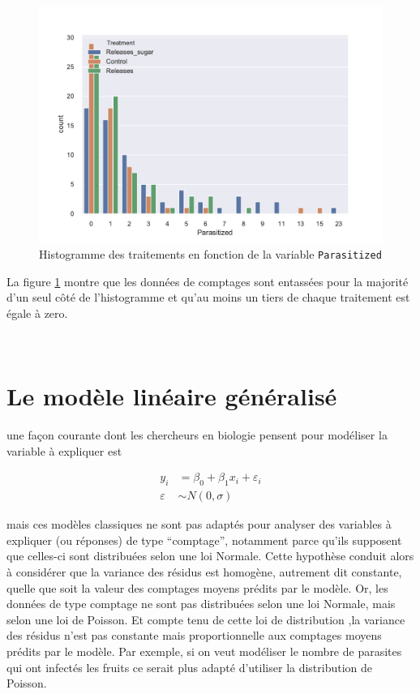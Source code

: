 \documentclass[12pt]{article}
\begin{document}
 \begin{figure}[h]
\centering
 \includegraphics[width=1\textwidth]{Histogram of the count.pdf}
 \caption{Histogramme des traitements en fonction de la variable \texttt{Parasitized} } 
 \label{hist_para}
 \end{figure}
 
 La figure \ref{hist_para} montre que les données de comptages sont entassées pour la majorité d'un seul côté de l'histogramme et qu'au moins un tiers de chaque traitement est égale à zero.


\newpage
~
\newpage
\section{Le modèle linéaire généralisé}
une façon courante dont les chercheurs en biologie pensent pour modéliser la variable à expliquer est

\begin{align*}
y_i &= \beta_0 + \beta_1 x_i + \varepsilon_i \\
\varepsilon &\sim N(0, \sigma)
\tag{1}
\end{align*}

mais ces modèles classiques ne sont pas adaptés pour analyser des variables à expliquer (ou réponses) de type “comptage”, notamment parce qu’ils supposent que celles-ci sont distribuées selon une loi Normale. Cette hypothèse conduit alors à considérer que la variance des résidus est homogène, autrement dit constante, quelle que soit la valeur des comptages moyens prédits par le modèle. Or, les données de type comptage ne sont pas distribuées selon une loi Normale, mais selon une loi de Poisson. Et compte tenu de cette loi de distribution ,la variance des résidus n’est pas constante mais proportionnelle aux comptages moyens prédits par le modèle.
Par exemple, si on veut modéliser le nombre de parasites qui ont infectés les fruits ce serait plus adapté d'utiliser la distribution de Poisson.
\end{document}
